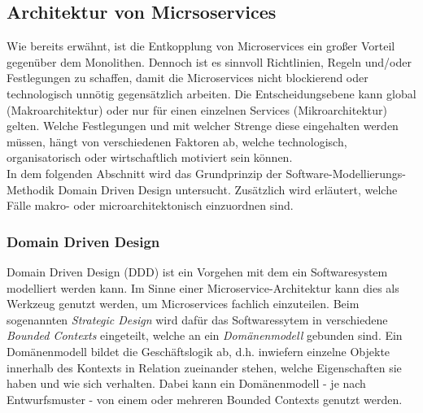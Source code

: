 \subsection{Architektur von Micrsoservices}


Wie bereits erwähnt, ist die Entkopplung von Microservices ein großer Vorteil gegenüber dem Monolithen. Dennoch ist es sinnvoll Richtlinien, Regeln und/oder Festlegungen zu schaffen, damit die Microservices nicht blockierend oder technologisch unnötig gegensätzlich arbeiten. Die Entscheidungsebene kann global (Makroarchitektur) oder nur für einen einzelnen Services (Mikroarchitektur) gelten.\cite{wolff2016mic_architectures} Welche Festlegungen und mit welcher Strenge diese eingehalten werden müssen, hängt von verschiedenen Faktoren ab, welche technologisch, organisatorisch oder wirtschaftlich motiviert sein können.\cite{rewe2019mic_ppp} \\ 

In dem folgenden Abschnitt wird das Grundprinzip der Software-Modellierungs-Methodik Domain Driven Design untersucht. Zusätzlich wird erläutert, welche Fälle makro- oder microarchitektonisch einzuordnen sind. \\

\subsubsection{Domain Driven Design}

Domain Driven Design (DDD) ist ein Vorgehen mit dem ein Softwaresystem modelliert werden kann. Im Sinne einer Microservice-Architektur kann dies als Werkzeug genutzt werden, um Microservices fachlich einzuteilen.\cite{heise2016ddd} Beim sogenannten \textit{Strategic Design} wird dafür das Softwaressytem in verschiedene \textit{Bounded Contexts} eingeteilt, welche an ein \textit{Domänenmodell} gebunden sind. Ein Domänenmodell bildet die Geschäftslogik ab, d.h. inwiefern einzelne Objekte innerhalb des Kontexts in Relation zueinander stehen, welche Eigenschaften sie haben und wie sich verhalten. Dabei kann ein Domänenmodell - je nach Entwurfsmuster - von einem oder mehreren Bounded Contexts genutzt werden.\cite{wolff2018mic_praxis}  \\


